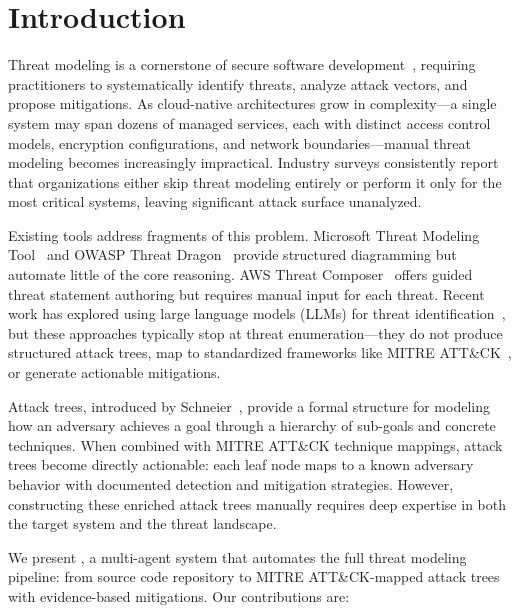 \section{Introduction}

Threat modeling is a cornerstone of secure software development~\cite{shostack2014threat}, requiring practitioners to systematically identify threats, analyze attack vectors, and propose mitigations. As cloud-native architectures grow in complexity---a single system may span dozens of managed services, each with distinct access control models, encryption configurations, and network boundaries---manual threat modeling becomes increasingly impractical. Industry surveys consistently report that organizations either skip threat modeling entirely or perform it only for the most critical systems, leaving significant attack surface unanalyzed.

Existing tools address fragments of this problem. Microsoft Threat Modeling Tool~\cite{microsoft-tmt} and OWASP Threat Dragon~\cite{owasp-threatdragon} provide structured diagramming but automate little of the core reasoning. AWS Threat Composer~\cite{aws-threatcomposer} offers guided threat statement authoring but requires manual input for each threat. Recent work has explored using large language models (LLMs) for threat identification~\cite{threatmodeling-llm2024,canllmsthreatmodel2025}, but these approaches typically stop at threat enumeration---they do not produce structured attack trees, map to standardized frameworks like MITRE ATT\&CK~\cite{strom2018mitre}, or generate actionable mitigations.

Attack trees, introduced by Schneier~\cite{schneier1999attack}, provide a formal structure for modeling how an adversary achieves a goal through a hierarchy of sub-goals and concrete techniques. When combined with MITRE ATT\&CK technique mappings, attack trees become directly actionable: each leaf node maps to a known adversary behavior with documented detection and mitigation strategies. However, constructing these enriched attack trees manually requires deep expertise in both the target system and the threat landscape.

We present \threatforest{}, a multi-agent system that automates the full threat modeling pipeline: from source code repository to MITRE ATT\&CK-mapped attack trees with evidence-based mitigations. Our contributions are:

